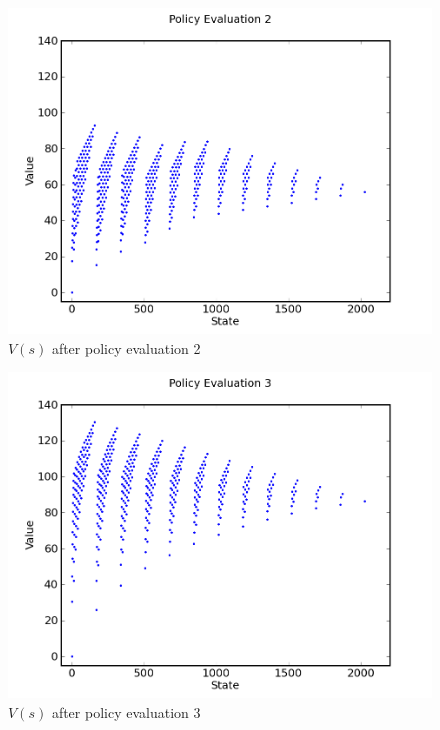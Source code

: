 \documentclass[a4paper]{article}
\begin{document}
\begin{figure}[h]
\center
\includegraphics[scale=0.75]{policy_iteration/evaluation_2.png}
\caption{$V(s)$ after policy evaluation 2}
\end{figure}

\begin{figure}[h]
\center
\includegraphics[scale=0.75]{policy_iteration/evaluation_3.png}
\caption{$V(s)$ after policy evaluation 3}
\end{figure}
\end{document}
